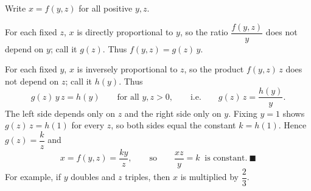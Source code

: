 Write $x=f(y,z)$ for all positive $y,z$.

For each fixed $z$, $x$ is directly proportional to $y$, so the ratio $\dfrac{f(y,z)}{y}$ does not depend on $y$; call it $g(z)$. Thus $f(y,z)=g(z)\,y$.

For each fixed $y$, $x$ is inversely proportional to $z$, so the product $f(y,z)\,z$ does not depend on $z$; call it $h(y)$. Thus
\[g(z)\,y\,z=h(y)\qquad\text{for all }y,z>0,\qquad\text{i.e.}\qquad g(z)\,z=\dfrac{h(y)}{y}.\]
The left side depends only on $z$ and the right side only on $y$. Fixing $y=1$ shows $g(z)\,z=h(1)$ for every $z$, so both sides equal the constant $k=h(1)$. Hence $g(z)=\dfrac kz$ and
\[x=f(y,z)=\dfrac{ky}{z},\qquad\text{so}\qquad\dfrac{xz}{y}=k\ \text{ is constant.}\ \blacksquare\]
For example, if $y$ doubles and $z$ triples, then $x$ is multiplied by $\dfrac23$.
